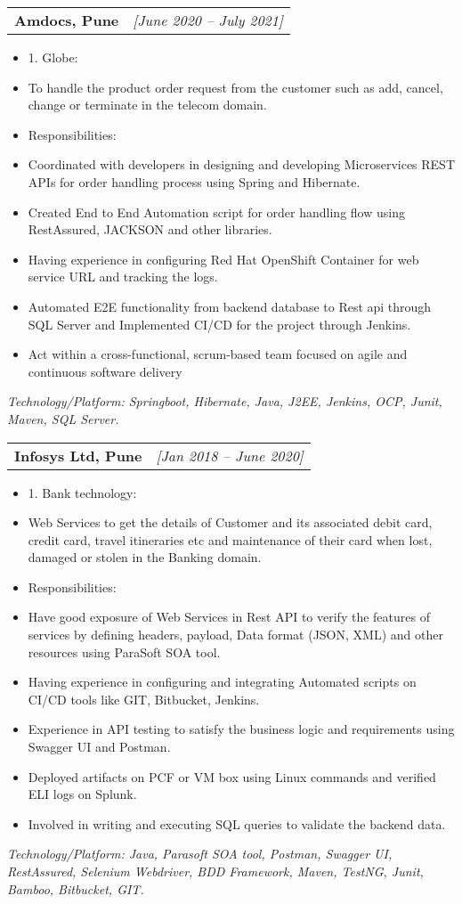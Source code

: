 \documentclass[a4paper,10pt]{article}
\makeatletter
\newcommand{\resitem}[1]{\item #1}
\newcommand{\ressubheading}[3]{\begin{tabular*}{6.62in}{l @{\extracolsep{\fill}} r} \textbf{#1} & \textit{[#2]} \\ \end{tabular*}\vspace{-8pt}}
\makeatother
\begin{document}
\ressubheading{Amdocs, Pune}{June 2020 – July 2021}{Software Engineer}
\begin{itemize}[nosep]
    \resitem{1. Globe:}
    \resitem{\hspace{0.5cm}To handle the product order request from the customer such as add, cancel, change or terminate in the telecom domain.}
    \resitem{\hspace{0.5cm}Responsibilities:}
    \resitem{\hspace{1cm}Coordinated with developers in designing and developing Microservices REST APIs for order handling process using Spring and Hibernate.}
    \resitem{\hspace{1cm}Created End to End Automation script for order handling flow using RestAssured, JACKSON and other libraries.}
    \resitem{\hspace{1cm}Having experience in configuring Red Hat OpenShift Container for web service URL and tracking the logs.}
    \resitem{\hspace{1cm}Automated E2E functionality from backend database to Rest api through SQL Server and Implemented CI/CD for the project through Jenkins.}
    \resitem{\hspace{1cm}Act within a cross-functional, scrum-based team focused on agile and continuous software delivery}
\end{itemize}
\textit{Technology/Platform: Springboot, Hibernate, Java, J2EE, Jenkins, OCP, Junit, Maven, SQL Server.}


\ressubheading{Infosys Ltd, Pune}{Jan 2018 – June 2020}{System Engineer}
\begin{itemize}[nosep]
    \resitem{1. Bank technology:}
    \resitem{\hspace{0.5cm}Web Services to get the details of Customer and its associated debit card, credit card, travel itineraries etc and maintenance of their card when lost, damaged or stolen in the Banking domain.}
    \resitem{\hspace{0.5cm}Responsibilities:}
    \resitem{\hspace{1cm}Have good exposure of Web Services in Rest API to verify the features of services by defining headers, payload, Data format (JSON, XML) and other resources using ParaSoft SOA tool.}
    \resitem{\hspace{1cm}Having experience in configuring and integrating Automated scripts on CI/CD tools like GIT, Bitbucket, Jenkins.}
    \resitem{\hspace{1cm}Experience in API testing to satisfy the business logic and requirements using Swagger UI and Postman.}
    \resitem{\hspace{1cm}Deployed artifacts on PCF or VM box using Linux commands and verified ELI logs on Splunk.}
    \resitem{\hspace{1cm}Involved in writing and executing SQL queries to validate the backend data.}
\end{itemize}
\textit{Technology/Platform: Java, Parasoft SOA tool, Postman, Swagger UI, RestAssured, Selenium Webdriver, BDD Framework, Maven, TestNG, Junit, Bamboo, Bitbucket, GIT.}
\end{document}
